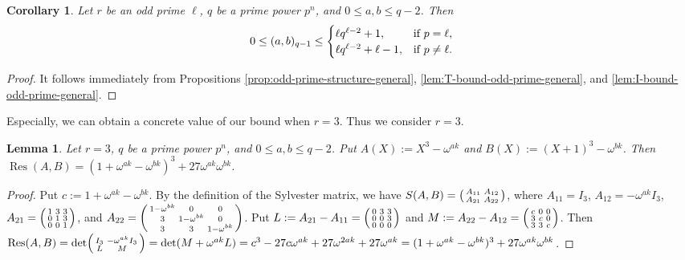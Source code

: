 \documentclass[10pt,a4paper]{article}
\newtheorem{lem}[thm]{Lemma}
\newtheorem{cor}[thm]{Corollary}
\newcommand{\Res}{\operatorname{Res}}
\numberwithin{equation}{section}
\begin{document}
\begin{cor}\label{cor:V-bound-odd-prime-general}
Let $r$ be an odd prime $\ell$, $q$ be a prime power $p^n$, and $0\le a,b\le q-2$. Then
\[
0\le (a,b)_{q-1}\le
\begin{cases}
\ell q^{\ell-2}+1, & \textup{if } p=\ell,\\
\ell q^{\ell-2}+\ell-1, & \textup{if } p\neq\ell.
\end{cases}
\]
\end{cor}

\begin{proof}
It follows immediately from Propositions \ref{prop:odd-prime-structure-general}, \ref{lem:T-bound-odd-prime-general}, and \ref{lem:I-bound-odd-prime-general}.
\end{proof}


Especially, we can obtain a concrete value of our bound when $r=3$. Thus we consider $r=3$.


\begin{lem}\label{lem:resultant-r3-general}
Let $r=3$, $q$ be a prime power $p^n$, and $0\le a,b\le q-2$. Put $A(X):=X^3-\omega^{ak}$ and $B(X):=(X+1)^3-\omega^{bk}$. Then $\Res(A,B)=(1+\omega^{ak}-\omega^{bk})^3+27\omega^{ak}\omega^{bk}$.
\end{lem}

\begin{proof}
Put $c:=1+\omega^{ak}-\omega^{bk}$. By the definition of the Sylvester matrix, we have
$S(A,B)=\begin{psmallmatrix} A_{11} & A_{12}\\ A_{21} & A_{22} \end{psmallmatrix}$, where
$A_{11}=I_3$, $A_{12}=-\omega^{ak}I_3$,
$A_{21}=\begin{psmallmatrix}1&3&3\\0&1&3\\0&0&1\end{psmallmatrix}$, and
$A_{22}=\begin{psmallmatrix}1-\omega^{bk}&0&0\\3&1-\omega^{bk}&0\\3&3&1-\omega^{bk}\end{psmallmatrix}$.
Put
$L:=A_{21}-A_{11}=\begin{psmallmatrix}0&3&3\\0&0&3\\0&0&0\end{psmallmatrix}$
and
$M:=A_{22}-A_{12}=\begin{psmallmatrix}c&0&0\\3&c&0\\3&3&c\end{psmallmatrix}$.
Then $\Res(A,B)=\det\begin{psmallmatrix} I_3 & -\omega^{ak}I_3\\ L & M \end{psmallmatrix}=\det(M+\omega^{ak}L)=c^3-27c\omega^{ak}+27\omega^{2ak}+27\omega^{ak}=(1+\omega^{ak}-\omega^{bk})^3+27\omega^{ak}\omega^{bk}$.
\end{proof}
\end{document}
